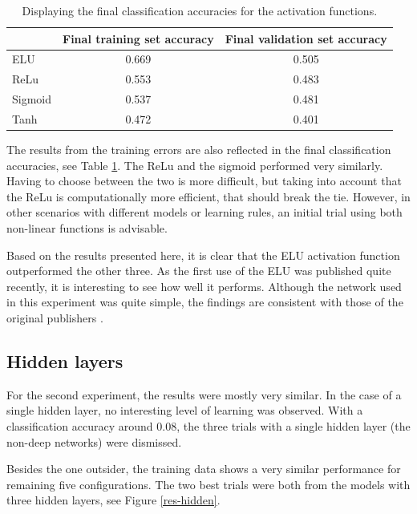 \documentclass[]{article}
\begin{document}
\begin{table}[]
	\centering
	\caption{Displaying the final classification accuracies for the activation functions.}
	\label{part1-table}
	\begin{tabular}{@{}lcc@{}}
		\toprule
		\multicolumn{1}{c}{} & Final training set accuracy & Final validation set accuracy \\ \midrule
		ELU & 0.669 & 0.505 \\
		ReLu & 0.553 & 0.483 \\
		Sigmoid & 0.537 & 0.481 \\
		Tanh & 0.472 & 0.401 \\ \bottomrule
	\end{tabular}
\end{table}

The results from the training errors are also reflected in the final classification accuracies, see Table \ref{part1-table}. The ReLu and the sigmoid performed very similarly. Having to choose between the two is more difficult, but taking into account that the ReLu is computationally more efficient, that should break the tie. However, in other scenarios with different models or learning rules, an initial trial using both non-linear functions is advisable.

Based on the results presented here, it is clear that the ELU activation function outperformed the other three. As the first use of the ELU was published quite recently, it is interesting to see how well it performs. Although the network used in this experiment was quite simple, the findings are consistent with those of the original publishers \cite{elu}. 

\subsection{Hidden layers}

For the second experiment, the results were mostly very similar. In the case of a single hidden layer, no interesting level of learning was observed. With a classification accuracy around 0.08, the three trials with a single hidden layer (the non-deep networks) were dismissed. 

Besides the one outsider, the training data shows a very similar performance for remaining five configurations. The two best trials were both from the models with three hidden layers, see Figure \ref{res-hidden}.
\end{document}
